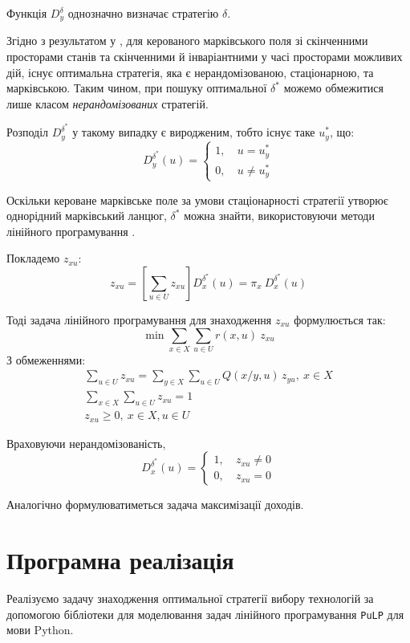 \documentclass[oneside,14pt]{extarticle}
\begin{document}
Функція \(D_y^\delta\) однозначно визначає стратегію \(\delta\).

Згідно з результатом у \cite{Chornei:2005}, для керованого марківського поля зі скінченними просторами станів та скінченними й інваріантними у часі просторами можливих дій, існує оптимальна стратегія, яка є нерандомізованою, стаціонарною, та марківською. Таким чином, при пошуку оптимальної \(\delta^*\) можемо обмежитися лише класом \textit{нерандомізованих} стратегій.

Розподіл \(D_y^{\delta^*}\) у такому випадку є виродженим, тобто існує таке \(u_y^*\), що:
\[D_y^{\delta^*}(u) = \begin{cases}
1,&\ u = u_y^* \\
0,&\ u \neq u_y^*
\end{cases}
\]

Оскільки кероване марківське поле за умови стаціонарності стратегії утворює однорідний марківський ланцюг, \(\delta^*\) можна знайти, використовуючи методи лінійного програмування \cite{Knopov:1998}.

Покладемо \(z_{xu}\):
\[z_{xu} = \left[\sum_{u \in U} z_{xu}\right]D_x^{\delta^*}(u) = \pi_x\ D_x^{\delta^*}(u)\]

Тоді задача лінійного програмування для знаходження \(z_{xu}\) формулюється так:
\[\min \sum_{x \in X} \sum_{u \in U} r(x, u)\ z_{xu}\]
З обмеженнями:
\begin{gather*}
\sum_{u \in U} z_{xu} = \sum_{y \in X} \sum_{u \in U} Q(x/y, u)\,z_{yu},\ x \in X \\
\sum_{x \in X} \sum_{u \in U} z_{xu} = 1 \\
z_{xu} \geq 0,\ x \in X, u \in U
\end{gather*}

Враховуючи нерандомізованість, 
\[D_x^{\delta^*}(u) = \begin{cases}
1,&\ z_{xu} \neq 0 \\
0,&\ z_{xu} = 0
\end{cases}\]

Аналогічно формулюватиметься задача максимізації доходів.










\clearpage
\section{Програмна реалізація}

Реалізуємо задачу знаходження оптимальної стратегії вибору технологій за допомогою бібліотеки для моделювання задач лінійного програмування \texttt{PuLP}\cite{PuLP} для мови Python.
\end{document}
